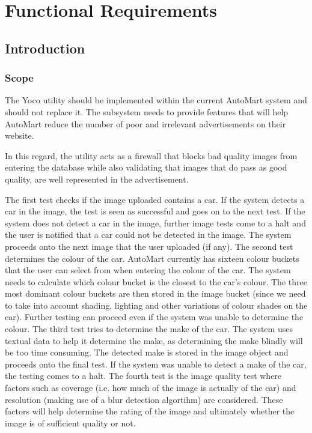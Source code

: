 \section{Functional Requirements}
\subsection{Introduction}

\subsubsection{Scope}
The Yoco utility should be implemented within the current AutoMart system and should not replace it. The subsystem needs to provide features that will help AutoMart reduce the number of poor and irrelevant advertisements on their website.

In this regard, the utility acts as a firewall that blocks bad quality images from entering the database while also validating that images that do pass as good quality, are well represented in the advertisement.

The first test checks if the image uploaded contains a car. If the system detects a car in the image, the test is seen as successful and goes on to the next test. If the system does not detect a car in the image, further image tests come to a halt and the user is notified that a car could not be detected in the image. The system proceeds onto the next image that the user uploaded (if any).
The second test determines the colour of the car. AutoMart currently has sixteen colour buckets that the user can select from when entering the colour of the car. The system needs to calculate which colour bucket is the closest to the car's colour. The three most dominant colour buckets are then stored in the image bucket (since we need to take into account shading, lighting and other variations of colour shades on the car). Further testing can proceed even if the system was unable to determine the colour. 
The third test tries to determine the make of the car. The system uses textual data to help it determine the make, as determining the make blindly will be too time consuming. The detected make is stored in the image object and proceeds onto the final test. If the system was unable to detect a make of the car, the testing comes to a halt. 
The fourth test is the image quality test where factors such as coverage (i.e. how much of the image is actually of the car) and resolution (making use of a blur detection algortihm) are considered. These factors will help determine the rating of the image and ultimately whether the image is of sufficient quality or not.

